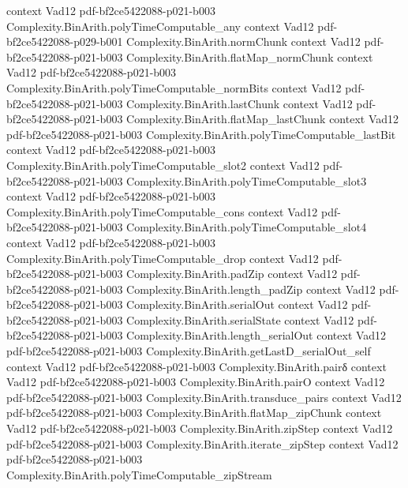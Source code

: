 \begin{theorem}
  {context}
  {Vad12}
  {pdf-bf2ce5422088-p021-b003}
\proofstep
  {Complexity.BinArith.polyTimeComputable_any}
  {context}
  {Vad12}
  {pdf-bf2ce5422088-p029-b001}
\proofstep
  {Complexity.BinArith.normChunk}
  {context}
  {Vad12}
  {pdf-bf2ce5422088-p021-b003}
\proofstep
  {Complexity.BinArith.flatMap_normChunk}
  {context}
  {Vad12}
  {pdf-bf2ce5422088-p021-b003}
\proofstep
  {Complexity.BinArith.polyTimeComputable_normBits}
  {context}
  {Vad12}
  {pdf-bf2ce5422088-p021-b003}
\proofstep
  {Complexity.BinArith.lastChunk}
  {context}
  {Vad12}
  {pdf-bf2ce5422088-p021-b003}
\proofstep
  {Complexity.BinArith.flatMap_lastChunk}
  {context}
  {Vad12}
  {pdf-bf2ce5422088-p021-b003}
\proofstep
  {Complexity.BinArith.polyTimeComputable_lastBit}
  {context}
  {Vad12}
  {pdf-bf2ce5422088-p021-b003}
\proofstep
  {Complexity.BinArith.polyTimeComputable_slot2}
  {context}
  {Vad12}
  {pdf-bf2ce5422088-p021-b003}
\proofstep
  {Complexity.BinArith.polyTimeComputable_slot3}
  {context}
  {Vad12}
  {pdf-bf2ce5422088-p021-b003}
\proofstep
  {Complexity.BinArith.polyTimeComputable_cons}
  {context}
  {Vad12}
  {pdf-bf2ce5422088-p021-b003}
\proofstep
  {Complexity.BinArith.polyTimeComputable_slot4}
  {context}
  {Vad12}
  {pdf-bf2ce5422088-p021-b003}
\proofstep
  {Complexity.BinArith.polyTimeComputable_drop}
  {context}
  {Vad12}
  {pdf-bf2ce5422088-p021-b003}
\proofstep
  {Complexity.BinArith.padZip}
  {context}
  {Vad12}
  {pdf-bf2ce5422088-p021-b003}
\proofstep
  {Complexity.BinArith.length_padZip}
  {context}
  {Vad12}
  {pdf-bf2ce5422088-p021-b003}
\proofstep
  {Complexity.BinArith.serialOut}
  {context}
  {Vad12}
  {pdf-bf2ce5422088-p021-b003}
\proofstep
  {Complexity.BinArith.serialState}
  {context}
  {Vad12}
  {pdf-bf2ce5422088-p021-b003}
\proofstep
  {Complexity.BinArith.length_serialOut}
  {context}
  {Vad12}
  {pdf-bf2ce5422088-p021-b003}
\proofstep
  {Complexity.BinArith.getLastD_serialOut_self}
  {context}
  {Vad12}
  {pdf-bf2ce5422088-p021-b003}
\proofstep
  {Complexity.BinArith.pairδ}
  {context}
  {Vad12}
  {pdf-bf2ce5422088-p021-b003}
\proofstep
  {Complexity.BinArith.pairO}
  {context}
  {Vad12}
  {pdf-bf2ce5422088-p021-b003}
\proofstep
  {Complexity.BinArith.transduce_pairs}
  {context}
  {Vad12}
  {pdf-bf2ce5422088-p021-b003}
\proofstep
  {Complexity.BinArith.flatMap_zipChunk}
  {context}
  {Vad12}
  {pdf-bf2ce5422088-p021-b003}
\proofstep
  {Complexity.BinArith.zipStep}
  {context}
  {Vad12}
  {pdf-bf2ce5422088-p021-b003}
\proofstep
  {Complexity.BinArith.iterate_zipStep}
  {context}
  {Vad12}
  {pdf-bf2ce5422088-p021-b003}
\proofstep
  {Complexity.BinArith.polyTimeComputable_zipStream}

\end{theorem}
